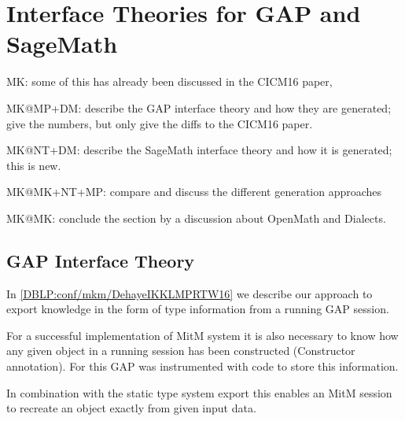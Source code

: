 \section{Interface Theories for GAP and SageMath}\label{sec:ift}
\begin{todolist}{MK: some of this has already been discussed in the CICM16 paper, }
\item MK@MP+DM: describe the GAP interface theory and how they are generated; give the
numbers, but only give the diffs to the CICM16 paper.

\item MK@NT+DM: describe the SageMath interface theory and how it is generated; this is
  new. 
\item MK@MK+NT+MP: compare and discuss the different generation approaches
\item MK@MK: conclude the section by a discussion about OpenMath and Dialects.
\end{todolist}


\subsection{GAP Interface Theory}

In \ref{DBLP:conf/mkm/DehayeIKKLMPRTW16} we describe our approach to export
knowledge in the form of type information from a running GAP session.

For a successful implementation of MitM system it is also necessary to
know how any given object in a running session has been constructed
(Constructor annotation). For this GAP was instrumented with code to store
this information.

In combination with the static type system export this enables an MitM session
to recreate an object exactly from given input data.



